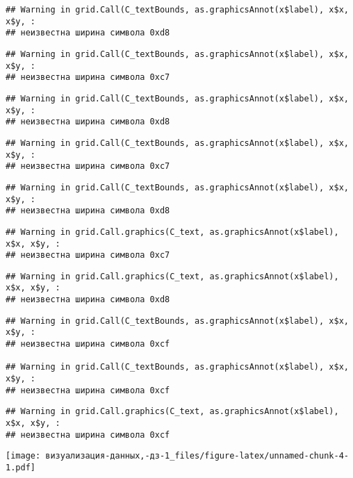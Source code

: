 \documentclass[
]{article}
\begin{document}
\begin{verbatim}
## Warning in grid.Call(C_textBounds, as.graphicsAnnot(x$label), x$x, x$y, :
## неизвестна ширина символа 0xd8
\end{verbatim}

\begin{verbatim}
## Warning in grid.Call(C_textBounds, as.graphicsAnnot(x$label), x$x, x$y, :
## неизвестна ширина символа 0xc7
\end{verbatim}

\begin{verbatim}
## Warning in grid.Call(C_textBounds, as.graphicsAnnot(x$label), x$x, x$y, :
## неизвестна ширина символа 0xd8
\end{verbatim}

\begin{verbatim}
## Warning in grid.Call(C_textBounds, as.graphicsAnnot(x$label), x$x, x$y, :
## неизвестна ширина символа 0xc7
\end{verbatim}

\begin{verbatim}
## Warning in grid.Call(C_textBounds, as.graphicsAnnot(x$label), x$x, x$y, :
## неизвестна ширина символа 0xd8
\end{verbatim}

\begin{verbatim}
## Warning in grid.Call.graphics(C_text, as.graphicsAnnot(x$label), x$x, x$y, :
## неизвестна ширина символа 0xc7
\end{verbatim}

\begin{verbatim}
## Warning in grid.Call.graphics(C_text, as.graphicsAnnot(x$label), x$x, x$y, :
## неизвестна ширина символа 0xd8
\end{verbatim}

\begin{verbatim}
## Warning in grid.Call(C_textBounds, as.graphicsAnnot(x$label), x$x, x$y, :
## неизвестна ширина символа 0xcf

## Warning in grid.Call(C_textBounds, as.graphicsAnnot(x$label), x$x, x$y, :
## неизвестна ширина символа 0xcf
\end{verbatim}

\begin{verbatim}
## Warning in grid.Call.graphics(C_text, as.graphicsAnnot(x$label), x$x, x$y, :
## неизвестна ширина символа 0xcf
\end{verbatim}

\texttt{[image: визуализация-данных,-дз-1\_files/figure-latex/unnamed-chunk-4-1.pdf]}
\end{document}
